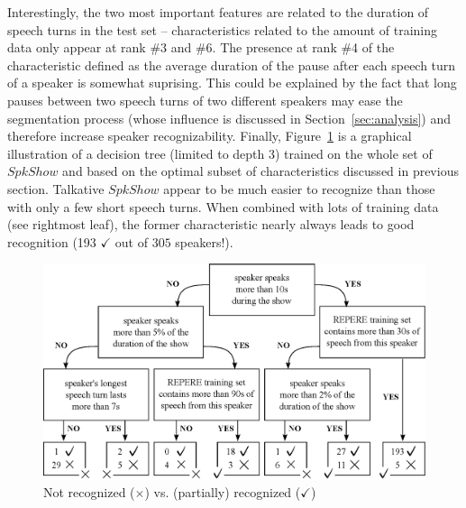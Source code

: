 Interestingly, the two most important features are related to the duration of speech turns in the test set -- characteristics related to the amount of training data only appear at rank \#3 and \#6. 
The presence at rank \#4 of the characteristic defined as the average duration of the pause after each speech turn of a speaker is somewhat suprising. This could be explained by the fact that long pauses between two speech turns of two different speakers may ease the segmentation process (whose influence is discussed in Section~\ref{sec:analysis}) and therefore increase speaker recognizability.
Finally, Figure~\ref{fig:tree} is a graphical illustration of a decision tree (limited to depth 3) trained on the whole set of $SpkShow$ and based on the optimal subset of characteristics discussed in previous section.
Talkative $SpkShow$ appear to be much easier to recognize than those with only a few short speech turns. When combined with lots of training data (see rightmost leaf), the former characteristic nearly always leads to good recognition (193 $\checkmark$ out of $305$ speakers!).
\begin{figure}[t]
\centering
\includegraphics[width=\linewidth]{figures/tree.eps}
\caption{Not recognized ($\times$) vs. (partially) recognized ($\checkmark$)}
\label{fig:tree}
\end{figure}



